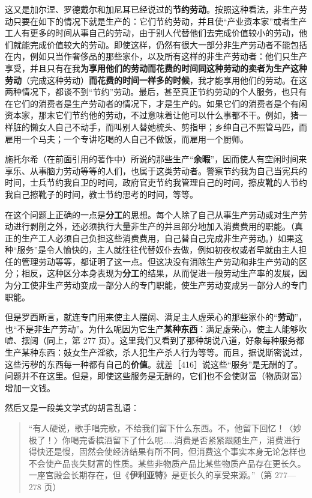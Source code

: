 这又是加尔涅、罗德戴尔和加尼耳已经说过的\textbf{节约劳动}。按照这种看法，非生产劳动只要在如下的情况下就是生产的：它们节约劳动，并且使“产业资本家”或者生产工人有更多的时间从事自己的劳动，由于别人代替他们去完成价值较小的劳动，他们就能完成价值较大的劳动。即使这样，仍然有很大一部分非生产劳动者不能包括在内，例如只当作奢侈品的那些家仆，以及所有这样的非生产劳动者：他们只生产享受，并且只有在我\textbf{为享用他们的劳动而花费的时间同这种劳动的卖者为生产这种劳动}（完成这种劳动）\textbf{而花费的时间一样多的时候}，我才能享用他们的劳动。在这两种情况下，都谈不到“节约”劳动。最后，甚至真正节约劳动的个人服务，也只有在它们的消费者是生产劳动者的情况下，才是生产的。如果它们的消费者是个有闲资本家，那末它们节约他的劳动，不过意味着让他可以什么事都不干。例如，猪一样脏的懒女人自己不动手，而叫别人替她梳头、剪指甲；乡绅自己不照管马匹，而雇用一个马夫；一个专讲吃喝的人自己不做饭，而雇用一个厨师。

施托尔希（在前面引用的著作中）所说的那些生产“\textbf{余暇}”，因而使人有空闲时间来享乐、从事脑力劳动等等的人们，也属于这类劳动者。警察节约我为自己当宪兵的时间，士兵节约我自卫的时间，政府官吏节约我管理自己的时间，擦皮靴的人节约我自己擦靴子的时间，教士节约思考的时间，等等。

在这个问题上正确的一点是\textbf{分工}的思想。每个人除了自己从事生产劳动或对生产劳动进行剥削之外，还必须执行大量非生产的并且部分地加入消费费用的职能。（真正的生产工人必须自己负担这些消费费用，自己替自己完成非生产劳动。）如果这种“服务”是令人愉快的，主人就往往代替奴仆去做，例如初夜权或者早就由主人担任的管理劳动等等，都证明了这一点。但这决没有消除生产劳动和非生产劳动的区分；相反，这种区分本身表现为\textbf{分工}的结果，从而促进一般劳动生产率的发展，因为分工使非生产劳动变成一部分人的专门职能，使生产劳动变成另一部分人的专门职能。

但是罗西断言，就连专门用来使主人摆阔、满足主人虚荣心的那些家仆的“\textbf{劳动}”，也“不是非生产劳动”。为什么呢因为它生产\textbf{某种东西}：满足虚荣心，使主人能够吹嘘、摆阔（同上，第 277 页）。这里我们又看到了那种胡说八道，好象每种服务都生产某种东西：妓女生产淫欲，杀人犯生产杀人行为等等。而且，据说斯密说过，这些污秽的东西每一种都有自己的\textbf{价值}。就差［416］说这些“服务”是无酬的了。问题并不在这里。但是，即使这些服务是无酬的，它们也不会使财富（物质财富）增加一文钱。

然后又是一段美文学式的胡言乱语：

\begin{quote}“有人硬说，歌手唱完歌，不给我们留下什么东西。不，他留下回忆！〈妙极了！〉你喝完香槟酒留下了什么呢……消费是否紧紧跟随生产，消费进行得快还是慢，固然会使经济结果有所不同，但消费这个事实本身无论怎样也不会使产品丧失财富的性质。某些非物质产品比某些物质产品存在更长久。一座宫殿会长期存在，但《\textbf{伊利亚特}》是更长久的享受来源。”（第 277—278 页）\end{quote}

